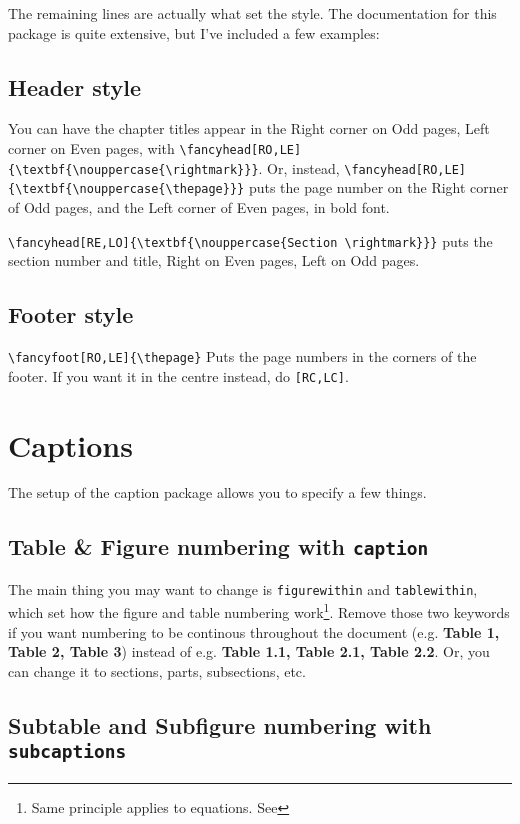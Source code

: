 \documentclass[../main]{subfiles}
\begin{document}
The remaining lines are actually what set the style. The documentation for this package is quite extensive, but I've included a few examples:

\subsection{Header style}

You can have the chapter titles appear in the Right corner on Odd pages, Left corner on Even pages, with \verb|\fancyhead[RO,LE]{\textbf{\nouppercase{\rightmark}}}|. Or, instead, \verb|\fancyhead[RO,LE]{\textbf{\nouppercase{\thepage}}}| puts the page number on the Right corner of Odd pages, and the Left corner of Even pages, in bold font. 

\verb|\fancyhead[RE,LO]{\textbf{\nouppercase{Section \rightmark}}}| puts the section number and title, Right on Even pages, Left on Odd pages.

\subsection{Footer style}

\verb|\fancyfoot[RO,LE]{\thepage}| Puts the page numbers in the corners of the footer. If you want it in the centre instead, do \verb|[RC,LC]|.

\section{Captions}

The setup of the caption package allows you to specify a few things.

\subsection{Table \& Figure numbering with \texttt{caption}}\label{sub:number_within}
 The main thing you may want to change is \texttt{figurewithin} and \texttt{tablewithin}, which set how the figure and table numbering work\footnote{Same principle applies to equations. See }. Remove those two keywords if you want numbering to be continous throughout the document (e.g. \textbf{Table 1, Table 2, Table 3}) instead of e.g. \textbf{Table 1.1, Table 2.1, Table 2.2}. Or, you can change it to sections, parts, subsections, etc.

\subsection{Subtable and Subfigure numbering with \texttt{subcaptions}}
\end{document}
